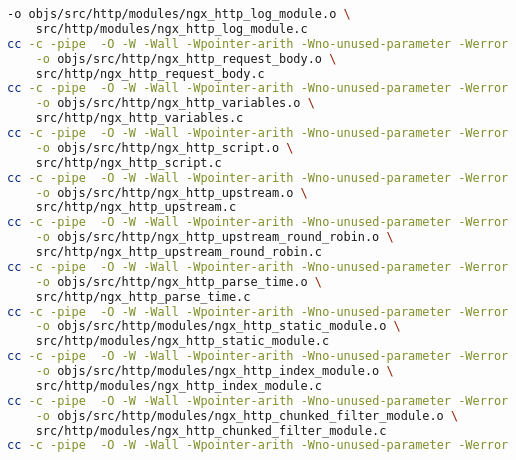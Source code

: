 \begin{lstlisting}[language=bash]
	-o objs/src/http/modules/ngx_http_log_module.o \
	src/http/modules/ngx_http_log_module.c
cc -c -pipe  -O -W -Wall -Wpointer-arith -Wno-unused-parameter -Werror -g  -I src/core -I src/event -I src/event/modules -I src/os/unix -I objs -I src/http -I src/http/modules \
	-o objs/src/http/ngx_http_request_body.o \
	src/http/ngx_http_request_body.c
cc -c -pipe  -O -W -Wall -Wpointer-arith -Wno-unused-parameter -Werror -g  -I src/core -I src/event -I src/event/modules -I src/os/unix -I objs -I src/http -I src/http/modules \
	-o objs/src/http/ngx_http_variables.o \
	src/http/ngx_http_variables.c
cc -c -pipe  -O -W -Wall -Wpointer-arith -Wno-unused-parameter -Werror -g  -I src/core -I src/event -I src/event/modules -I src/os/unix -I objs -I src/http -I src/http/modules \
	-o objs/src/http/ngx_http_script.o \
	src/http/ngx_http_script.c
cc -c -pipe  -O -W -Wall -Wpointer-arith -Wno-unused-parameter -Werror -g  -I src/core -I src/event -I src/event/modules -I src/os/unix -I objs -I src/http -I src/http/modules \
	-o objs/src/http/ngx_http_upstream.o \
	src/http/ngx_http_upstream.c
cc -c -pipe  -O -W -Wall -Wpointer-arith -Wno-unused-parameter -Werror -g  -I src/core -I src/event -I src/event/modules -I src/os/unix -I objs -I src/http -I src/http/modules \
	-o objs/src/http/ngx_http_upstream_round_robin.o \
	src/http/ngx_http_upstream_round_robin.c
cc -c -pipe  -O -W -Wall -Wpointer-arith -Wno-unused-parameter -Werror -g  -I src/core -I src/event -I src/event/modules -I src/os/unix -I objs -I src/http -I src/http/modules \
	-o objs/src/http/ngx_http_parse_time.o \
	src/http/ngx_http_parse_time.c
cc -c -pipe  -O -W -Wall -Wpointer-arith -Wno-unused-parameter -Werror -g  -I src/core -I src/event -I src/event/modules -I src/os/unix -I objs -I src/http -I src/http/modules \
	-o objs/src/http/modules/ngx_http_static_module.o \
	src/http/modules/ngx_http_static_module.c
cc -c -pipe  -O -W -Wall -Wpointer-arith -Wno-unused-parameter -Werror -g  -I src/core -I src/event -I src/event/modules -I src/os/unix -I objs -I src/http -I src/http/modules \
	-o objs/src/http/modules/ngx_http_index_module.o \
	src/http/modules/ngx_http_index_module.c
cc -c -pipe  -O -W -Wall -Wpointer-arith -Wno-unused-parameter -Werror -g  -I src/core -I src/event -I src/event/modules -I src/os/unix -I objs -I src/http -I src/http/modules \
	-o objs/src/http/modules/ngx_http_chunked_filter_module.o \
	src/http/modules/ngx_http_chunked_filter_module.c
cc -c -pipe  -O -W -Wall -Wpointer-arith -Wno-unused-parameter -Werror -g  -I src/core -I src/event -I src/event/modules -I src/os/unix -I objs -I src/http -I src/http/modules \

\end{lstlisting}
